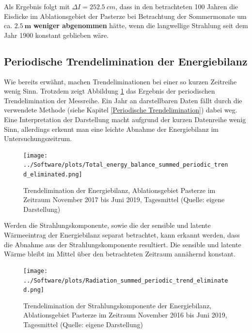 \documentclass[11pt,a4paper]{article}
\begin{document}
Als Ergebnis folgt mit $\Delta I = 252.5~cm$, dass in den betrachteten 100 Jahren die Eisdicke im Ablationsgebiet der Pasterze bei Betrachtung der Sommermonate um ca. $\mathbf{2.5~m}$ \textbf{weniger abgenommen} hätte, wenn die langwellige Strahlung seit dem Jahr 1900 konstant geblieben wäre.



\subsection{Periodische Trendelimination der Energiebilanz}

Wie bereits erwähnt, machen Trendeliminationen bei einer so kurzen Zeitreihe wenig Sinn. Trotzdem zeigt Abbildung \ref{fig:Trendelimination der Energiebilanz} das Ergebnis der periodischen Trendelimination der Messreihe. Ein Jahr an darstellbaren Daten fällt durch die verwendete Methode (siehe Kapitel \ref{Periodische Trendelimination}) dabei weg. Eine Interpretation der Darstellung macht aufgrund der kurzen Datenreihe wenig Sinn, allerdings erkennt man eine leichte Abnahme der Energiebilanz im Untersuchungszeitrum.

\begin{figure}[H]
\centering
\texttt{[image: ../Software/plots/Total\_energy\_balance\_summed\_periodic\_trend\_eliminated.png]}
\caption[Trendelimination der Energiebilanz, Ablationsgebiet Pasterze im Zeitraum November 2017 bis Juni 2019, Tagesmittel]{Trendelimination der Energiebilanz, Ablationsgebiet Pasterze im Zeitraum November 2017 bis Juni 2019, Tagesmittel (Quelle: eigene Darstellung)}
\label{fig:Trendelimination der Energiebilanz}
\end{figure}

Werden die Strahlungskomponente, sowie die der sensible und latente Wärmeeintrag der Energiebilanz separat betrachtet, kann erkannt werden, dass  die Abnahme aus der Strahlungskomponente resultiert. Die sensible und latente Wärme bleibt im Mittel über den betrachteten Zeitraum annähernd konstant.

\begin{figure}[H]
\centering
\texttt{[image: ../Software/plots/Radiation\_summed\_periodic\_trend\_eliminated.png]}
\caption[Trendelimination der Strahlungskomponente der Energiebilanz, Ablationsgebiet Pasterze im Zeitraum November 2016 bis Juni 2019, Tagesmittel]{Trendelimination der Strahlungskomponente der Energiebilanz, Ablationsgebiet Pasterze im Zeitraum November 2016 bis Juni 2019, Tagesmittel (Quelle: eigene Darstellung)}
\label{fig:Trendelimination der Strahlungskomponente der Energiebilanz}
\end{figure}
\end{document}

